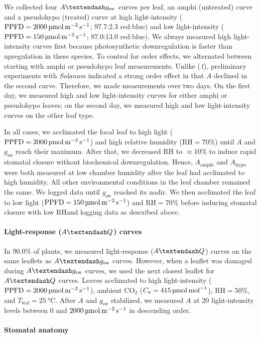 \documentclass[
  letterpaper,
  DIV=11,
  numbers=noendperiod]{scrartcl}
\let\oldparagraph\paragraph
\renewcommand{\paragraph}[1]{\oldparagraph{#1}\mbox{}}
\newcommand{\Aamphi}{$A_{\mathrm{amphi}}$}
\newcommand{\Ahypo}{$A_{\mathrm{hypo}}$}
\newcommand{\agcurve}{$A \textendash g_\text{sw}$}
\newcommand{\aqcurve}{$A \textendash Q$}
\newcommand{\caequals}[1]{$C_\mathrm{a} = \qty{#1}{\micro\mol\raiseto{-1}\mol}$}
\newcommand{\gsw}{$g_\text{sw}$}
\newcommand{\ppfdequals}[1]{$\mathrm{PPFD} = \qty{#1}{\micro\mol\raiseto{-2}\meter\raiseto{-1}\second}$}
\newcommand{\rh}{$\mathrm{RH}$}
\newcommand{\rhequals}[1]{$\mathrm{RH} = #1\%$}
\newcommand{\tleafequals}[1]{$T_\mathrm{leaf} = \qty{#1}{\degreeCelsius}$}
\begin{document}
We collected four \agcurve{} curves per leaf, an amphi (untreated) curve
and a pseudohypo (treated) curve at high light-intensity
(\ppfdequals{2000}; 97.7:2.3 red:blue) and low light-intensity
(\ppfdequals{150}; 87.0:13.0 red:blue). We always measured high
light-intensity curves first because photosynthetic downregulation is
faster than upregulation in these species. To control for order effects,
we alternated between starting with amphi or pseudohypo leaf
measurements. Unlike (\emph{1}), preliminary experiments with
\emph{Solanum} indicated a strong order effect in that \(A\) declined in
the second curve. Therefore, we made measurements over two days. On the
first day, we measured high and low light-intensity curves for either
amphi or pseudohypo leaves; on the second day, we measured high and low
light-intensity curves on the other leaf type.

In all cases, we acclimated the focal leaf to high light
(\ppfdequals{2000}) and high relative humidity (\rhequals{70}) until
\(A\) and \gsw{} reach their maximum. After that, we decreased \rh{} to
\(\approx 10\%\) to induce rapid stomatal closure without biochemical
downregulation. Hence, \Aamphi{} and \Ahypo{} were both measured at low
chamber humidity after the leaf had acclimated to high humidity. All
other environmental conditions in the leaf chamber remained the same. We
logged data until \gsw{} reached its nadir. We then acclimated the leaf
to low light (\ppfdequals{150}) and \rhequals{70} before inducing
stomatal closure with low \rh and logging data as described above.

\paragraph{\texorpdfstring{Light-response (\aqcurve)
curves}{Light-response () curves}}\label{light-response-curves}

In 90.0\% of plants, we measured light-response (\aqcurve) curves on the
same leaflets as \agcurve{} curves. However, when a leaflet was damaged
during \agcurve{} curves, we used the next closest leaflet for
\aqcurve{} curves. Leaves acclimated to high light-intensity
(\ppfdequals{2000}), ambient CO\(_2\) (\caequals{415}), \rhequals{50},
and \tleafequals{25}. After \(A\) and \gsw{} stabilized, we measured
\(A\) at 20 light-intensity levels between \(0\) and
\(\qty{2000}{\micro\mol\raiseto{-2}\meter\raiseto{-1}\second}\) in
descending order.

\paragraph{Stomatal anatomy}\label{stomatal-anatomy}
\end{document}
